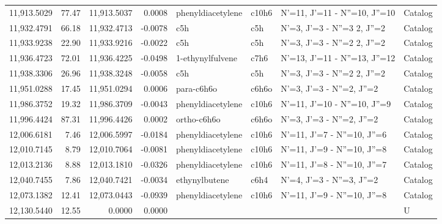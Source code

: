 \begin{longtable}{rrrrllll}
11,913.5029 &     77.47 &       11,913.5037 &    0.0008 &           phenyldiacetylene &   c10h6 &        N'=11, J'=11 - N''=10, J''=10 &    Catalog \\
11,932.4791 &     66.18 &       11,932.4713 &   -0.0078 &                         c5h &     c5h &      N'=3, J'=3 - N''=3     2, J''=2 &    Catalog \\
11,933.9238 &     22.90 &       11,933.9216 &   -0.0022 &                         c5h &     c5h &      N'=3, J'=3 - N''=2     2, J''=2 &    Catalog \\
11,936.4723 &     72.01 &       11,936.4225 &   -0.0498 &            1-ethynylfulvene &    c7h6 &        N'=13, J'=11 - N''=13, J''=12 &    Catalog \\
11,938.3306 &     26.96 &       11,938.3248 &   -0.0058 &                         c5h &     c5h &      N'=3, J'=3 - N''=2     2, J''=2 &    Catalog \\
11,951.0288 &     17.45 &       11,951.0294 &    0.0006 &                  para-c6h6o &   c6h6o &            N'=3, J'=3 - N''=2, J''=2 &    Catalog \\
11,986.3752 &     19.32 &       11,986.3709 &   -0.0043 &           phenyldiacetylene &   c10h6 &         N'=11, J'=10 - N''=10, J''=9 &    Catalog \\
11,996.4424 &     87.31 &       11,996.4426 &    0.0002 &                 ortho-c6h6o &   c6h6o &            N'=3, J'=3 - N''=2, J''=2 &    Catalog \\
12,006.6181 &      7.46 &       12,006.5997 &   -0.0184 &           phenyldiacetylene &   c10h6 &          N'=11, J'=7 - N''=10, J''=6 &    Catalog \\
12,010.7145 &      8.79 &       12,010.7064 &   -0.0081 &           phenyldiacetylene &   c10h6 &          N'=11, J'=9 - N''=10, J''=8 &    Catalog \\
12,013.2136 &      8.88 &       12,013.1810 &   -0.0326 &           phenyldiacetylene &   c10h6 &          N'=11, J'=8 - N''=10, J''=7 &    Catalog \\
12,040.7455 &      7.86 &       12,040.7421 &   -0.0034 &               ethynylbutene &    c6h4 &            N'=4, J'=3 - N''=3, J''=2 &    Catalog \\
12,073.1382 &     12.41 &       12,073.0443 &   -0.0939 &           phenyldiacetylene &   c10h6 &          N'=11, J'=9 - N''=10, J''=8 &    Catalog \\
12,130.5440 &     12.55 &            0.0000 &    0.0000 &                             &         &                                      &          U \\

\end{longtable}

